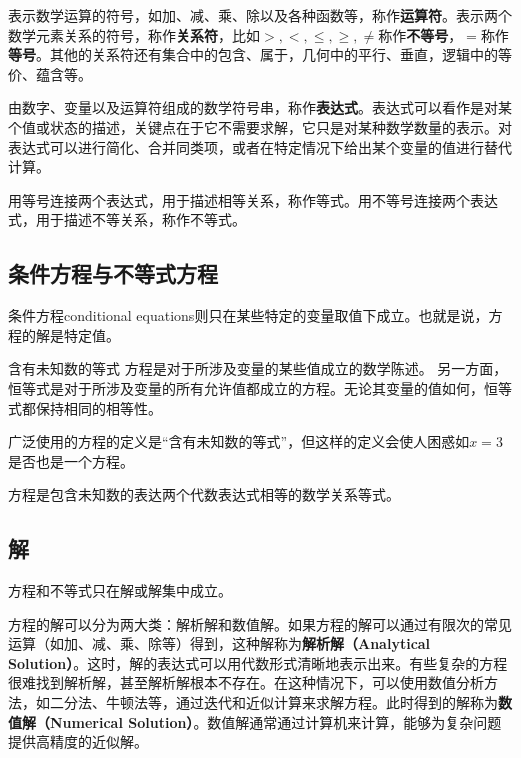 
\begin{issues}
\issueDraft
\end{issues}

表示数学运算的符号，如加、减、乘、除以及各种函数等，称作\textbf{运算符}。表示两个数学元素关系的符号，称作\textbf{关系符}，比如$>,<,\leq,\geq,\neq$称作\textbf{不等号}，$=$称作\textbf{等号}。其他的关系符还有集合中的包含、属于，几何中的平行、垂直，逻辑中的等价、蕴含等。

由数字、变量以及运算符组成的数学符号串，称作\textbf{表达式}。表达式可以看作是对某个值或状态的描述，关键点在于它不需要求解，它只是对某种数学数量的表示。对表达式可以进行简化、合并同类项，或者在特定情况下给出某个变量的值进行替代计算。


用等号连接两个表达式，用于描述相等关系，称作等式。用不等号连接两个表达式，用于描述不等关系，称作不等式。%


\subsection{条件方程与不等式方程}

条件方程conditional equations则只在某些特定的变量取值下成立。也就是说，方程的解是特定值。

含有未知数的等式
方程是对于所涉及变量的某些值成立的数学陈述。
另一方面，恒等式是对于所涉及变量的所有允许值都成立的方程。无论其变量的值如何，恒等式都保持相同的相等性。

广泛使用的方程的定义是“含有未知数的等式”，但这样的定义会使人困惑如$x=3$是否也是一个方程。

方程是包含未知数的表达两个代数表达式相等的数学关系等式。

\subsection{解}

方程和不等式只在解或解集中成立。

方程的解可以分为两大类：解析解和数值解。如果方程的解可以通过有限次的常见运算（如加、减、乘、除等）得到，这种解称为\textbf{解析解（Analytical Solution）}。这时，解的表达式可以用代数形式清晰地表示出来。有些复杂的方程很难找到解析解，甚至解析解根本不存在。在这种情况下，可以使用数值分析方法，如二分法、牛顿法等，通过迭代和近似计算来求解方程。此时得到的解称为\textbf{数值解（Numerical Solution）}。数值解通常通过计算机来计算，能够为复杂问题提供高精度的近似解。

